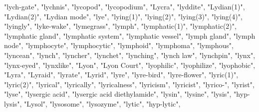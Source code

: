 "lych-gate",
"lychnis",
"lycopod",
"lycopodium",
"Lycra",
"lyddite",
"Lydian(1)",
"Lydian(2)",
"Lydian mode",
"lye",
"lying(1)",
"lying(2)",
"lying(3)",
"lying(4)",
"lyingly",
"lyke-wake",
"lymegrass",
"lymph",
"lymphatic(1)",
"lymphatic(2)",
"lymphatic gland",
"lymphatic system",
"lymphatic vessel",
"lymph gland",
"lymph node",
"lymphocyte",
"lymphocytic",
"lymphoid",
"lymphoma",
"lymphous",
"lyncean",
"lynch",
"lyncher",
"lynchet",
"lynching",
"lynch law",
"lynchpin",
"lynx",
"lynx-eyed",
"lynxlike",
"Lyon",
"Lyon Court",
"lyophilic",
"lyophilize",
"lyophobic",
"Lyra",
"Lyraid",
"lyrate",
"Lyrid",
"lyre",
"lyre-bird",
"lyre-flower",
"lyric(1)",
"lyric(2)",
"lyrical",
"lyrically",
"lyricalness",
"lyricism",
"lyricist",
"lyrico-",
"lyrist",
"lyse",
"lysergic acid",
"lysergic acid diethylamide",
"lysin",
"lysine",
"lysis",
"hyp-lysis",
"Lysol",
"lysosome",
"lysozyme",
"lytic",
"hyp-lytic",

